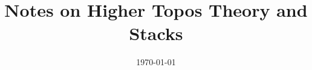 \pagestyle{scrheadings}
\clearscrheadfoot

\ifoot{\VARname}
\cfoot{\pagemark}
\ofoot{\today}

\title{\Large Notes on Higher Topos Theory and Stacks}
\author{\VARname}
\date{\today}

\maketitle